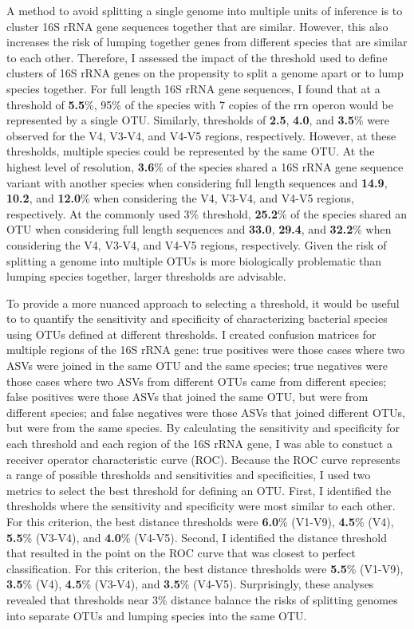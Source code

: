 \documentclass[
]{article}
\begin{document}
A method to avoid splitting a single genome into multiple units of
inference is to cluster 16S rRNA gene sequences together that are
similar. However, this also increases the risk of lumping together genes
from different species that are similar to each other. Therefore, I
assessed the impact of the threshold used to define clusters of 16S rRNA
genes on the propensity to split a genome apart or to lump species
together. For full length 16S rRNA gene sequences, I found that at a
threshold of \textbf{5.5}\%, 95\% of the species with 7 copies of the
rrn operon would be represented by a single OTU. Similarly, thresholds
of \textbf{2.5}, \textbf{4.0}, and \textbf{3.5}\% were observed for the
V4, V3-V4, and V4-V5 regions, respectively. However, at these
thresholds, multiple species could be represented by the same OTU. At
the highest level of resolution, \textbf{3.6}\% of the species shared a
16S rRNA gene sequence variant with another species when considering
full length sequences and \textbf{14.9}, \textbf{10.2}, and
\textbf{12.0}\% when considering the V4, V3-V4, and V4-V5 regions,
respectively. At the commonly used 3\% threshold, \textbf{25.2}\% of the
species shared an OTU when considering full length sequences and
\textbf{33.0}, \textbf{29.4}, and \textbf{32.2}\% when considering the
V4, V3-V4, and V4-V5 regions, respectively. Given the risk of splitting
a genome into multiple OTUs is more biologically problematic than
lumping species together, larger thresholds are advisable.

To provide a more nuanced approach to selecting a threshold, it would be
useful to to quantify the sensitivity and specificity of characterizing
bacterial species using OTUs defined at different thresholds. I created
confusion matrices for multiple regions of the 16S rRNA gene: true
positives were those cases where two ASVs were joined in the same OTU
and the same species; true negatives were those cases where two ASVs
from different OTUs came from different species; false positives were
those ASVs that joined the same OTU, but were from different species;
and false negatives were those ASVs that joined different OTUs, but were
from the same species. By calculating the sensitivity and specificity
for each threshold and each region of the 16S rRNA gene, I was able to
constuct a receiver operator characteristic curve (ROC). Because the ROC
curve represents a range of possible thresholds and sensitivities and
specificities, I used two metrics to select the best threshold for
defining an OTU. First, I identified the thresholds where the
sensitivity and specificity were most similar to each other. For this
criterion, the best distance thresholds were \textbf{6.0}\% (V1-V9),
\textbf{4.5}\% (V4), \textbf{5.5}\% (V3-V4), and \textbf{4.0}\% (V4-V5).
Second, I identified the distance threshold that resulted in the point
on the ROC curve that was closest to perfect classification. For this
criterion, the best distance thresholds were \textbf{5.5}\% (V1-V9),
\textbf{3.5}\% (V4), \textbf{4.5}\% (V3-V4), and \textbf{3.5}\% (V4-V5).
Surprisingly, these analyses revealed that thresholds near 3\% distance
balance the risks of splitting genomes into separate OTUs and lumping
species into the same OTU.
\end{document}
